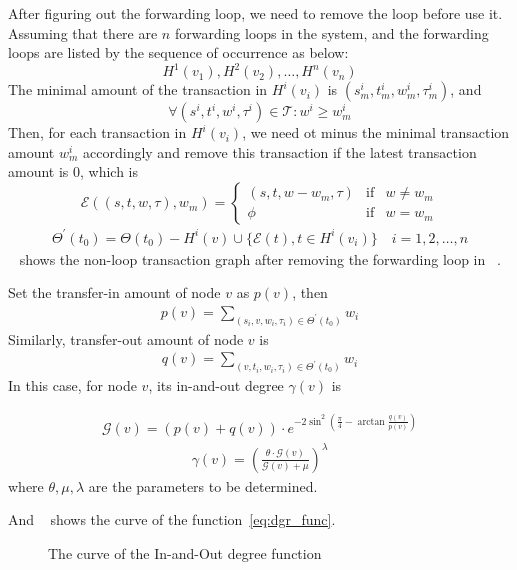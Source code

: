 After figuring out the forwarding loop, we need to remove the loop before use it. Assuming that there are $n$ forwarding loops in the system, and the forwarding loops are listed by the sequence of occurrence as below:
\[
H^1(v_1), H^2(v_2), \dots, H^n(v_n)\]
\noindent The minimal amount of the transaction in $H^i(v_i)$ is $(s^i_m, t^i_m, w^i_m, \tau^i_m)$, and
\[
\forall (s^i, t^i, w^i, \tau^i) \in \mathcal{T} : w^i \ge w^i_m
\]
\noindent Then, for each transaction in $H^i(v_i)$, we need ot minus the minimal transaction amount $w^i_m$ accordingly and remove this transaction if the latest transaction amount is 0, which is
\[
\mathcal{E}((s, t, w, \tau), w_m) = \left\{ \begin{array}{rcl}
(s, t, w-w_m, \tau) & \mbox{if} & w \ne w_m \\
\phi & \mbox{if} & w = w_m
\end{array}\right.
\]
\begin{align}
\Theta^{\prime}(t_0)=\Theta(t_0)-H^i(v) \cup \{\mathcal{E}(t), t\in H^i(v_i)\} \quad i = 1, 2,\dots, n
\end{align}
\noindent ~ shows the non-loop transaction graph after removing the forwarding loop in ~.


Set the transfer-in amount of node $v$ as $p(v)$, then
\begin{align}
\label{eq:dgr_func}
p(v) = \sum_{(s_i, v, w_i, \tau_i) \in \Theta^{\prime}(t_0)}{w_i}
\end{align}
\noindent Similarly, transfer-out amount of node $v$ is
\begin{align}
q(v) = \sum_{(v, t_i, w_i, \tau_i) \in \Theta^{\prime}(t_0)}{w_i}
\end{align}
\noindent In this case,
for node $v$, its in-and-out degree $\gamma(v)$ is

\begin{align}
\mathcal{G}(v) = (p(v) + q(v)) \cdot e^{-2\sin^2{(\frac{\pi}{4} - \arctan\frac{q(v)}{p(v)})}}
\end{align}
\begin{align}
\gamma(v) = (\frac{\theta\cdot \mathcal{G}(v)}{\mathcal{G}(v) + \mu})^{\lambda}
\end{align}
\noindent where $\theta, \mu, \lambda$ are the parameters to be determined.


And ~ shows the curve of the function~\ref{eq:dgr_func}.
\begin{figure}
  \centering
  
\caption{The curve of the In-and-Out degree function \label{fig-surf}}
\end{figure}

